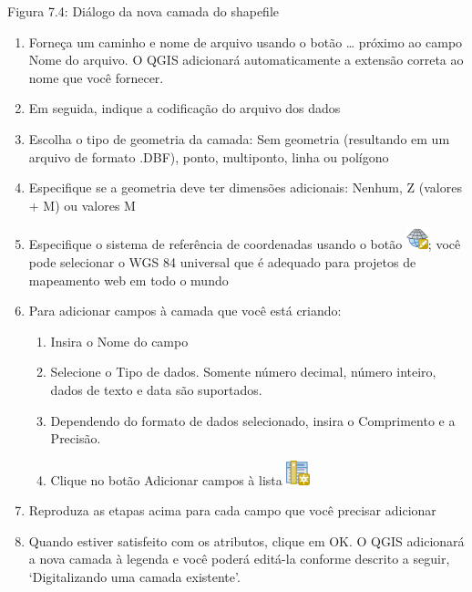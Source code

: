 \documentclass[
  portuguese,
]{krantz}
\providecommand{\tightlist}{%
  \setlength{\itemsep}{0pt}\setlength{\parskip}{0pt}}
\begin{document}
Figura 7.4: Diálogo da nova camada do shapefile

\begin{enumerate}
\def\labelenumi{\arabic{enumi}.}
\setcounter{enumi}{1}
\item
  Forneça um caminho e nome de arquivo usando o botão \ldots{} próximo ao campo Nome do arquivo. O QGIS adicionará automaticamente a extensão correta ao nome que você fornecer.
\item
  Em seguida, indique a codificação do arquivo dos dados
\item
  Escolha o tipo de geometria da camada: Sem geometria (resultando em um arquivo de formato .DBF), ponto, multiponto, linha ou polígono
\item
  Especifique se a geometria deve ter dimensões adicionais: Nenhum, Z (valores + M) ou valores M
\item
  Especifique o sistema de referência de coordenadas usando o botão \includegraphics{media/modulo7/mActionSetProjection.png}; você pode selecionar o WGS 84 universal que é adequado para projetos de mapeamento web em todo o mundo
\item
  Para adicionar campos à camada que você está criando:

  \begin{enumerate}
  \def\labelenumii{\arabic{enumii}.}
  \tightlist
  \item
    Insira o Nome do campo
  \item
    Selecione o Tipo de dados. Somente número decimal, número inteiro, dados de texto e data são suportados.
  \item
    Dependendo do formato de dados selecionado, insira o Comprimento e a Precisão.
  \item
    Clique no botão Adicionar campos à lista \includegraphics{media/modulo7/mActionNewAttribute.png}
  \end{enumerate}
\item
  Reproduza as etapas acima para cada campo que você precisar adicionar
\item
  Quando estiver satisfeito com os atributos, clique em OK. O QGIS adicionará a nova camada à legenda e você poderá editá-la conforme descrito a seguir, `Digitalizando uma camada existente'.
\end{enumerate}
\end{document}

